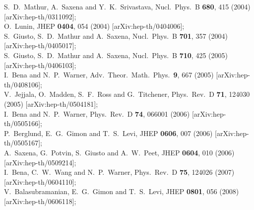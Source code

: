 \documentclass[12pt]{article}
\begin{document}
\begin{thebibliography}{10}
S.~D.~Mathur, A.~Saxena and Y.~K.~Srivastava,
  Nucl.\ Phys.\ B {\bf 680}, 415 (2004)
  [arXiv:hep-th/0311092];\\
O.~Lunin,
  JHEP {\bf 0404}, 054 (2004)
  [arXiv:hep-th/0404006];\\
S.~Giusto, S.~D.~Mathur and A.~Saxena,
  Nucl.\ Phys.\ B {\bf 701}, 357 (2004)
  [arXiv:hep-th/0405017];\\
S.~Giusto, S.~D.~Mathur and A.~Saxena,
  Nucl.\ Phys.\  B {\bf 710}, 425 (2005)
  [arXiv:hep-th/0406103];\\
I.~Bena and N.~P.~Warner,
  Adv.\ Theor.\ Math.\ Phys.\  {\bf 9}, 667 (2005)
  [arXiv:hep-th/0408106];\\
V.~Jejjala, O.~Madden, S.~F.~Ross and G.~Titchener,
  Phys.\ Rev.\  D {\bf 71}, 124030 (2005)
  [arXiv:hep-th/0504181];\\
I.~Bena and N.~P.~Warner,
  Phys.\ Rev.\  D {\bf 74}, 066001 (2006)
  [arXiv:hep-th/0505166];\\
P.~Berglund, E.~G.~Gimon and T.~S.~Levi,
  JHEP {\bf 0606}, 007 (2006)
  [arXiv:hep-th/0505167];\\
A.~Saxena, G.~Potvin, S.~Giusto and A.~W.~Peet,
  JHEP {\bf 0604}, 010 (2006)
  [arXiv:hep-th/0509214];\\
I.~Bena, C.~W.~Wang and N.~P.~Warner,
  Phys.\ Rev.\  D {\bf 75}, 124026 (2007)
  [arXiv:hep-th/0604110];\\
V.~Balasubramanian, E.~G.~Gimon and T.~S.~Levi,
  JHEP {\bf 0801}, 056 (2008)
  [arXiv:hep-th/0606118];\\

\end{thebibliography}
\end{document}
